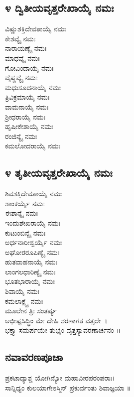\subsection{೪ ದ್ವಿತೀಯವೃತ್ತರೇಖಾಯೈ ನಮಃ}
 ವಿಷ್ಣುಶಕ್ತಿದೇವತಾಯೈ ನಮಃ\\
 ಕೇಶವ್ಯೈ ನಮಃ\\
 ನಾರಾಯಣ್ಯೈ ನಮಃ\\
 ಮಾಧವ್ಯೈ ನಮಃ\\
 ಗೋವಿಂದಾಯೈ ನಮಃ\\
 ವೈಷ್ಣವ್ಯೈ ನಮಃ\\
 ಮಧುಸೂದನಾಯೈ ನಮಃ\\
 ತ್ರಿವಿಕ್ರಮಾಯೈ ನಮಃ\\
 ವಾಮನಾಯೈ ನಮಃ\\
 ಶ್ರೀಧರಾಯೈ ನಮಃ\\
 ಹೃಷೀಕೇಶಾಯೈ ನಮಃ\\
 ರಂಜಿನ್ಯೈ ನಮಃ\\
 ಕಮಲೋದರಾಯೈ ನಮಃ
\subsection{೪ ತೃತೀಯವೃತ್ತರೇಖಾಯೈ ನಮಃ}
 ಶಿವಶಕ್ತಿದೇವತಾಯೈ ನಮಃ\\
 ಶಾಂಕರ್ಯೈ ನಮಃ\\
 ಈಶಾನ್ಯೈ ನಮಃ\\
 ಇಂದುಶೇಖರಾಯೈ ನಮಃ\\
 ಕುಟುಂಬಿನ್ಯೈ ನಮಃ\\
 ಅರ್ಧನಾರೀಶ್ವರ್ಯೈ ನಮಃ\\
 ಅಘೋರರೂಪಿಣ್ಯೈ ನಮಃ\\
 ಹುತವಾಹನಾಯೈ ನಮಃ\\
 ಲಾಂಗಲಧಾರಿಣ್ಯೈ ನಮಃ\\
 ಭೂತಭಾರಾಯೈ ನಮಃ\\
 ಶಿವಾಯೈ ನಮಃ\\
 ಕಮಲಾಕ್ಷ್ಯೈ ನಮಃ\\
ಮೂಲೇನ ತ್ರಿಃ ಸಂತರ್ಪ್ಯ\\
 ಅಭೀಷ್ಟಸಿದ್ಧಿಂ ಮೇ ದೇಹಿ ಶರಣಾಗತ ವತ್ಸಲೇ~।\\
ಭಕ್ತ್ಯಾ ಸಮರ್ಪಯೇ ತುಭ್ಯಂ ವೃತ್ತಸ್ಯಾವರಣಾರ್ಚನಂ ॥
\subsection{ನವಾವರಣಪೂಜಾ}
ಪ್ರಕಟಾದ್ಯಾಶ್ಚ ಯೋಗಿನ್ಯೋ ಮಹಾವೀರಪರಂಪರಾಃ।\\
ಸಾನ್ನಿಧ್ಯಂ ಕುಲಯಾಗೇಽಸ್ಮಿನ್ ಪ್ರಕುರ್ವಂತು ಶಿವಾಜ್ಞಯಾ ॥

